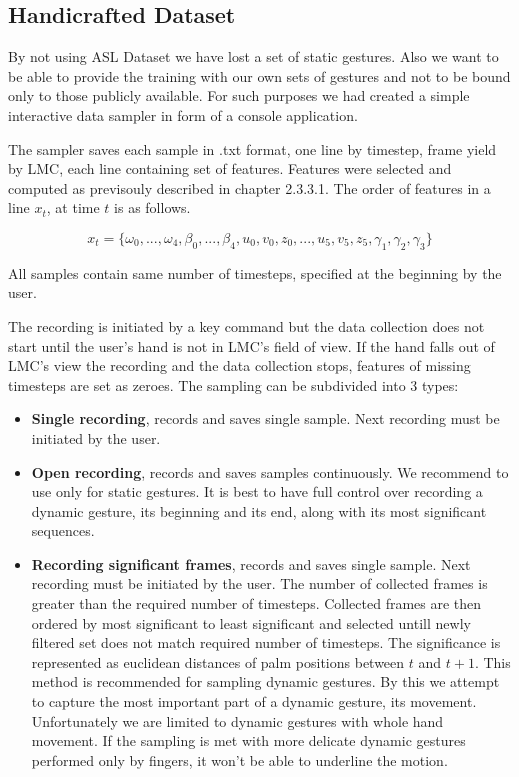 \subsection{Handicrafted Dataset}

By not using ASL Dataset we have lost a set of static gestures. Also we want to be able to provide the training with our own sets of gestures and not to be bound only to those publicly available. For such purposes we had created a simple interactive data sampler in form of a console application.

The sampler saves each sample in .txt format, one line by timestep, frame yield by LMC, each line containing set of features. Features were selected and computed as previsouly described in chapter 2.3.3.1. The order of features in a line $x_t$, at time $t$ is as follows.

\begin{equation}
	{x_t = \{\omega_0, ...,\omega_4, \beta_0, ..., \beta_4, u_0,v_0,z_0, ..., u_5,v_5,z_5, \gamma_1, \gamma_2, \gamma_3\}}
\end{equation}



All samples contain same number of timesteps, specified at the beginning by the user. 

The recording is initiated by a key command but the data collection does not start until the user's hand is not in LMC's field of view. If the hand falls out of LMC's view the recording and the data collection stops, features of missing timesteps are set as zeroes. The sampling can be subdivided into 3 types:

\begin{itemize}
	\item \textbf{Single recording}, records and saves single sample. Next recording must be initiated by the user.
    \item \textbf{Open recording}, records and saves samples continuously. We recommend to use only for static gestures. It is best to have full control over recording a dynamic gesture, its beginning and its end, along with its most significant sequences.
    \item \textbf{Recording significant frames}, records and saves single sample. Next recording must be initiated by the user. The number of collected frames is greater than the required number of timesteps. Collected frames are then ordered by most significant to least significant and selected untill newly filtered set does not match required number of timesteps. The significance is represented as euclidean distances of palm positions between $t$ and $t+1$. This method is recommended for sampling dynamic gestures. By this we attempt to capture the most important part of a dynamic gesture, its movement. Unfortunately we are limited to dynamic gestures with whole hand movement. If the sampling is met with more delicate dynamic gestures performed only by fingers, it won't be able to underline the motion.
\end{itemize}


